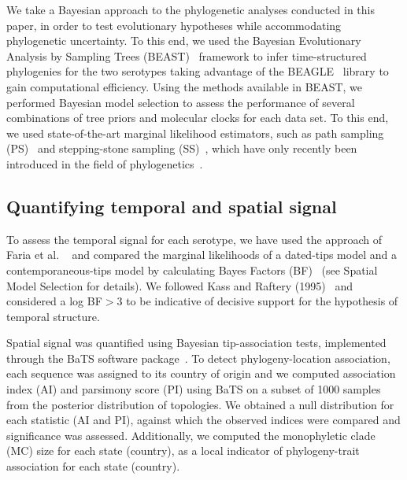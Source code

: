 \documentclass[10pt]{article}
\begin{document}
We take a Bayesian approach to the phylogenetic analyses conducted in this paper, in order to test evolutionary hypotheses while accommodating phylogenetic uncertainty. 
To this end, we used the Bayesian Evolutionary Analysis by Sampling Trees (BEAST)~\cite{beast2012} framework to infer time-structured phylogenies for the two serotypes taking advantage of the  BEAGLE~\cite{BEAGLE} library to gain computational efficiency.
Using the methods available in BEAST, we performed Bayesian model selection to assess the performance of several combinations of tree priors and molecular clocks for each data set.
To this end, we used state-of-the-art marginal likelihood estimators, such as path sampling (PS)~\cite{LartillotPhilippe} and stepping-stone sampling (SS)~\cite{Xie}, which have only recently been introduced in the field of phylogenetics~\cite{LartillotPhilippe, Xie, Baele2012, Baele2013a, Baele2013b}.

\subsection*{Quantifying temporal and spatial signal} 

To assess the temporal signal for each serotype, we have used the approach of Faria et al. ~\cite{Faria2012} and compared the marginal likelihoods of a dated-tips model and a contemporaneous-tips model by calculating Bayes Factors (BF)~\cite{Suchard2001, suchard2005models} (see Spatial Model Selection for details).
We followed Kass and Raftery (1995)~\cite{KassRaftery1995} and considered a log BF$>$3 to be indicative of decisive support for the hypothesis of temporal structure.

Spatial signal was quantified using Bayesian tip-association tests, implemented through the BaTS software package~\cite{bats}.
To detect phylogeny-location association, each sequence was assigned to its country of origin and we computed association index (AI) and parsimony score (PI) using BaTS on  a subset of 1000 samples from the posterior distribution of topologies.
We obtained a null distribution for each statistic (AI and PI), against which the observed indices were compared and significance was assessed.
Additionally, we computed the monophyletic clade (MC) size for each state (country), as a local indicator of phylogeny-trait association for each state (country).
\end{document}
